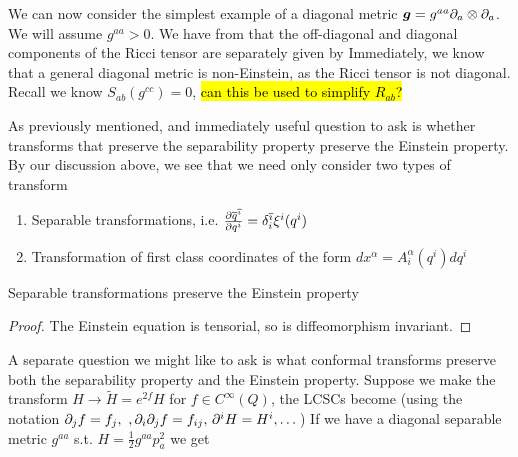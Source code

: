 \documentclass{article}
\begin{document}
We can now consider the simplest example of a diagonal metric $\bm{g} = g^{aa} \del_a \otimes \del_a$. We will assume $g^{aa} > 0$. We have from \cite{Win1996} that the off-diagonal and diagonal components of the Ricci tensor are separately given by 
Immediately, we know that a general diagonal metric is non-Einstein, as the Ricci tensor is not diagonal. \\
Recall we know $S_{ab}(g^{cc}) = 0$, \hl{can this be used to simplify $R_{ab}$?}


As previously mentioned, and immediately useful question to ask is whether transforms that preserve the separability property preserve the Einstein property. By our discussion above, we see that we need only consider two types of transform 
\begin{enumerate}
    \item Separable transformations, i.e. $\pd[\bar{q}^{\bar{\imath}}]{q^i} = \delta_i^{\bar{\imath}}\xi^i(q^i)$
    \item Transformation of first class coordinates of the form $dx^\alpha = A^\alpha_i(q^i) dq^i $
\end{enumerate}

\begin{prop}
Separable transformations preserve the Einstein property
\end{prop}
\begin{proof}
The Einstein equation is tensorial, so is diffeomorphism invariant. 
\end{proof}


A separate question we might like to ask is what conformal transforms preserve both the separability property and the Einstein property. Suppose we make the transform $H \to \tilde{H} = e^{2f}H$ for $f \in C^\infty(Q)$, the LCSCs become (using the notation $\del_j f = f_{j}, \ ,\del_i\del_j f = f_{ij}, \, \del^iH = H^i, \dots$)
If we have a diagonal separable metric $g^{aa}$ s.t. $H = \frac{1}{2} g^{aa} p_a^2$ we get 
\end{document}

